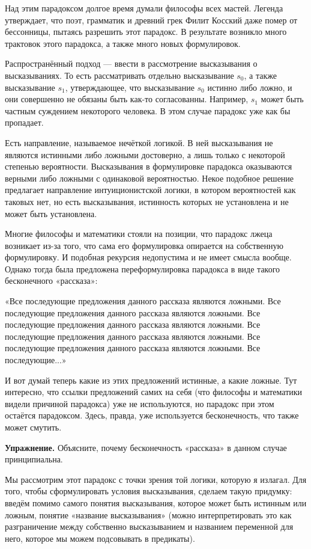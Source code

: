 Над этим парадоксом долгое время думали философы всех мастей. Легенда утверждает, что поэт, грамматик и древний грек Филит Косский даже помер от бессонницы, пытаясь разрешить этот парадокс. В результате возникло много трактовок этого парадокса, а также много новых формулировок.

Распространённый подход — ввести в рассмотрение высказывания о высказываниях. То есть рассматривать отдельно высказывание $s_0$, а также высказывание $s_1$, утверждающее, что высказывание $s_0$ истинно либо ложно, и они совершенно не обязаны быть как-то согласованны. Например, $s_1$ может быть частным суждением некоторого человека. В этом случае парадокс уже как бы пропадает.

Есть направление, называемое нечёткой логикой. В ней высказывания не являются истинными либо ложными достоверно, а лишь только с некоторой степенью вероятности. Высказывания в формулировке парадокса оказываются верными либо ложными с одинаковой вероятностью. Некое подобное решение предлагает направление интуиционистской логики, в котором вероятностей как таковых нет, но есть высказывания, истинность которых не установлена и не может быть установлена.

Многие философы и математики стояли на позиции, что парадокс лжеца возникает из-за того, что сама его формулировка опирается на собственную формулировку. И подобная рекурсия недопустима и не имеет смысла вообще. Однако тогда была предложена переформулировка парадокса в виде такого бесконечного «рассказа»:

«Все последующие предложения данного рассказа являются ложными. Все последующие предложения данного рассказа являются ложными. Все последующие предложения данного рассказа являются ложными. Все последующие предложения данного рассказа являются ложными. Все последующие предложения данного рассказа являются ложными. Все последующие...»

И вот думай теперь какие из этих предложений истинные, а какие ложные. Тут интересно, что ссылки предложений самих на себя (что философы и математики видели причиной парадокса) уже не используются, но парадокс при этом остаётся парадоксом. Здесь, правда, уже используется бесконечность, что также может смутить.

{\bfseries Упражнение.} Объясните, почему бесконечность «рассказа» в данном случае принципиальна.

Мы рассмотрим этот парадокс с точки зрения той логики, которую я излагал. Для того, чтобы сформулировать условия высказывания, сделаем такую придумку: введём помимо самого понятия высказывания, которое может быть истинным или ложным, понятие «название высказывания» (можно интерпретировать это как разграничение между собственно высказыванием и названием переменной для него, которое мы можем подсовывать в предикаты).

